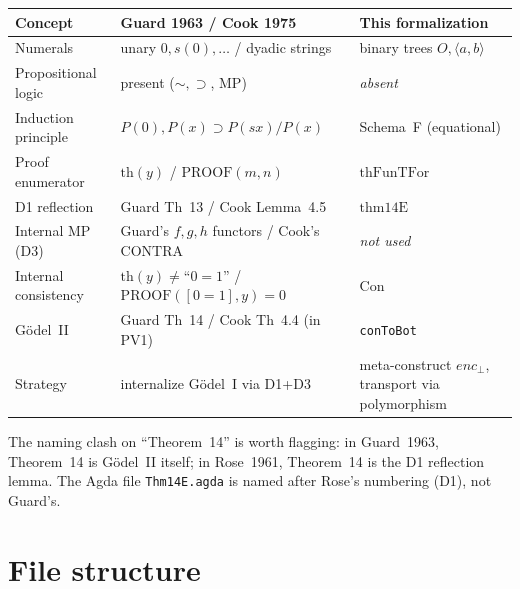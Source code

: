 \documentclass[11pt]{article}
\newcommand{\pair}[2]{\langle #1, #2 \rangle}
\newcommand{\thFunTFor}{\mathrm{thFunTFor}}
\begin{document}
\begin{center}
\begin{tabular}{lll}
\hline
\textbf{Concept} & \textbf{Guard 1963} / \textbf{Cook 1975} & \textbf{This formalization} \\
\hline
Numerals               & unary $0, s(0), \ldots$ / dyadic strings & binary trees $O, \pair{a}{b}$ \\
Propositional logic    & present ($\sim, \supset$, MP)            & \emph{absent} \\
Induction principle    & $P(0), P(x){\supset}P(sx)/P(x)$           & Schema~F (equational) \\
Proof enumerator       & $\mathrm{th}(y)$ / $\mathrm{PROOF}(m,n)$  & $\thFunTFor$ \\
D1 reflection          & Guard Th~13 / Cook Lemma~4.5              & $\mathrm{thm14E}$ \\
Internal MP (D3)       & Guard's $f,g,h$ functors / Cook's $\mathrm{CONTRA}$ & \emph{not used} \\
Internal consistency   & $\mathrm{th}(y) \neq \text{``}0{=}1\text{''}$ / $\mathrm{PROOF}([0{=}1],y)=0$ & $\mathrm{Con}$ \\
G\"odel~II             & Guard Th~14 / Cook Th~4.4 (in PV1)        & \texttt{conToBot} \\
Strategy               & internalize G\"odel~I via D1+D3           & meta-construct $\mathit{enc}_\bot$, transport via polymorphism \\
\hline
\end{tabular}
\end{center}

\noindent
The naming clash on ``Theorem~14'' is worth flagging:
in Guard~1963, Theorem~14 is G\"odel~II itself; in
Rose~1961, Theorem~14 is the D1 reflection lemma.
The Agda file \texttt{Thm14E.agda} is named after Rose's
numbering (D1), not Guard's.

\section{File structure}
\end{document}
